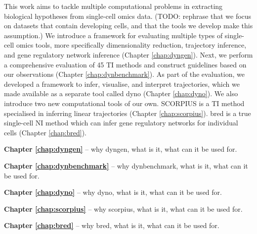 This work aims to tackle multiple computational problems in extracting biological hypotheses from single-cell omics data. (TODO: rephrase that we focus on datasets that contain developing cells, and that the tools we develop make this assumption.)
We introduce a framework for evaluating multiple types of single-cell omics tools, more specifically dimensionality reduction, trajectory inference, and gene regulatory network inference (Chapter \ref{chap:dyngen}). Next, we perform a comprehensive evaluation of 45 TI methods and construct guidelines based on our observations (Chapter \ref{chap:dynbenchmark}). As part of the evaluation, we developed a framework to infer, visualise, and interpret trajectories, which we made available as a separate tool called dyno (Chapter \ref{chap:dyno}).
We also introduce two new computational tools of our own. SCORPIUS is a TI method specialised in inferring linear trajectories (Chapter \ref{chap:scorpius}). bred is a true single-cell NI method which can infer gene regulatory networks for individual cells (Chapter \ref{chap:bred}).



\textbf{Chapter \ref{chap:dyngen}} -- why dyngen, what is it, what can it be used for.

\textbf{Chapter \ref{chap:dynbenchmark}} -- why dynbenchmark, what is it, what can it be used for.

\textbf{Chapter \ref{chap:dyno}} -- why dyno, what is it, what can it be used for.

\textbf{Chapter \ref{chap:scorpius}} -- why scorpius, what is it, what can it be used for.

\textbf{Chapter \ref{chap:bred}} -- why bred, what is it, what can it be used for.



%

